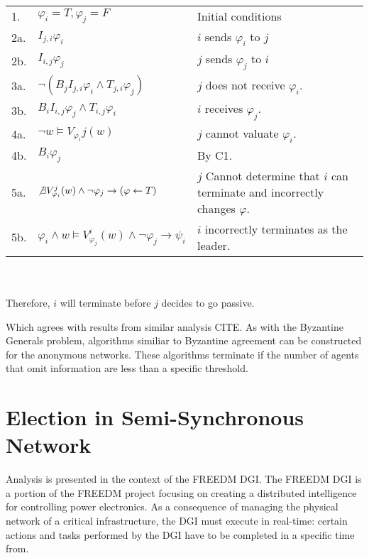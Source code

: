 \begin{table}[h!]
\centering
\small
\begin{tabularx}{\linewidth}{l X X}
1. & $\varphi_i = T, \varphi_j = F$ & Initial conditions \\
2a.& $I_{j,i} \varphi_i$ & $i$ sends $\varphi_i$ to $j$ \\
2b.& $I_{i,j} \varphi_j$ & $j$ sends $\varphi_j$ to $i$ \\
3a.& $\neg (B_j I_{j,i} \varphi_i \wedge T_{j,i} \varphi_j)$ & $j$ does not receive $\varphi_i$. \\
3b.& $B_i I_{i,j} \varphi_j \wedge T_{i,j} \varphi_i$ & $i$ receives $\varphi_j$. \\
4a.& $\neg w \vDash V_{\varphi_i}{j}(w)$ & $j$ cannot valuate $\varphi_i$. \\
4b.& $B_i \varphi_j$ & By C1. \\
5a. & $\not \exists V_{\varphi_i}^j(w) \wedge \neg \varphi_j \rightarrow (\varphi \gets T)$ & $j$ Cannot determine that $i$ can terminate and incorrectly changes $\varphi$. \\
5b. & $\varphi_i \wedge w \vDash V_{\varphi_j}^i(w) \wedge \neg \varphi_j \rightarrow \psi_i$ & $i$ incorrectly terminates as the leader. \\

\end{tabularx} \\~\\
Therefore, $i$ will terminate before $j$ decides to go passive.
\label{tab:annonymityproof}
\end{table}

Which agrees with results from similar analysis CITE.
As with the Byzantine Generals problem, algorithms similiar to Byzantine agreement can be constructed for the anonymous networks.
These algorithms terminate if the number of agents that omit information are less than a specific threshold. 

\section{Election in Semi-Synchronous Network}

Analysis is presented in the context of the \ac{FREEDM} \ac{DGI}. The \ac{FREEDM} \ac{DGI} is a portion of the \ac{FREEDM} project focusing on creating a distributed intelligence for controlling power electronics. As a consequence of managing the physical network of a critical infrastructure, the \ac{DGI} must execute in real-time: certain actions and tasks performed by the \ac{DGI} have to be completed in a specific time from.

